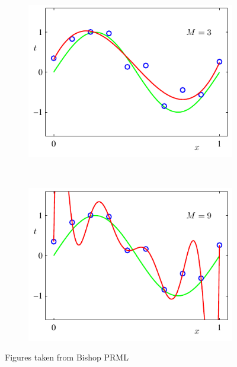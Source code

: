 \begin{figure}
    \begin{subfigure}[b]{0.45\textwidth}
                \centering
                \includegraphics[width=\textwidth]{./lecture1/Figure1_4c}
    \end{subfigure}%
	~
	\begin{subfigure}[b]{0.45\textwidth}
                \centering
                \includegraphics[width=\textwidth]{./lecture1/Figure1_4d}
    \end{subfigure}%
	\caption{Figures taken from Bishop PRML}
\end{figure}


